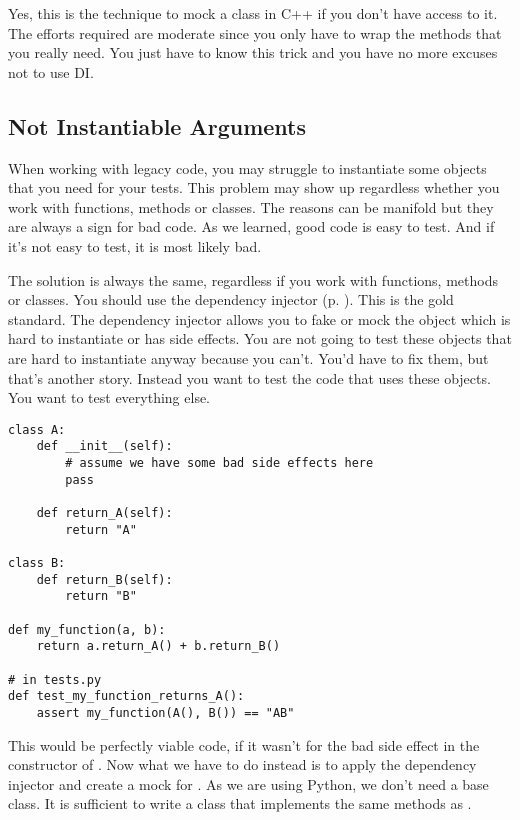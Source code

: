Yes, this is the technique to mock a class in C++ if you don't have access to it. The efforts required are moderate since you only have to wrap the methods that you really need. You just have to know this trick and you have no more excuses not to use DI.

\subsection{Not Instantiable Arguments}

When working with legacy code, you may struggle to instantiate some objects that you need for your tests. This problem may show up regardless whether you work with functions, methods or classes. The reasons can be manifold but they are always a sign for bad code. As we learned, good code is easy to test. And if it's not easy to test, it is most likely bad. 

The solution is always the same, regardless if you work with functions, methods or classes. You should use the dependency injector (p. \pageref{sec:dependency_injector}). This is the gold standard. The dependency injector allows you to fake or mock the object which is hard to instantiate or has side effects. You are not going to test these objects that are hard to instantiate anyway because you can't. You'd have to fix them, but that's another story. Instead you want to test the code that uses these objects. You want to test everything else.

\begin{programcode}{}
\begin{verbatim}
class A:
    def __init__(self):
        # assume we have some bad side effects here
        pass

    def return_A(self):
        return "A"
    
class B:
    def return_B(self):
        return "B"

def my_function(a, b):
    return a.return_A() + b.return_B()

# in tests.py
def test_my_function_returns_A():
    assert my_function(A(), B()) == "AB"
\end{verbatim}
\end{programcode}

This would be perfectly viable code, if it wasn't for the bad side effect in the constructor of . Now what we have to do instead is to apply the dependency injector and create a mock for . As we are using Python, we don't need a base class. It is sufficient to write a class that implements the same methods as .

